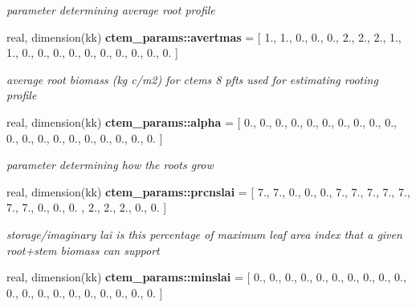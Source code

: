 \begin{DoxyCompactItemize}
\begin{DoxyCompactList}\small\item\em parameter determining average root profile \end{DoxyCompactList}\item 
\hypertarget{namespacectem__params_ad1f59f53c14c2a0c09bfad6b11139bca}{}real, dimension(kk) {\bfseries ctem\+\_\+params\+::avertmas} = \mbox{[} 1., 1., 0., 0., 0., 2., 2., 2., 1., 1., 0., 0., 0., 0., 0., 0., 0., 0., 0., 0. \mbox{]}\label{namespacectem__params_ad1f59f53c14c2a0c09bfad6b11139bca}

\begin{DoxyCompactList}\small\item\em average root biomass (kg c/m2) for ctem\textquotesingle{}s 8 pfts used for estimating rooting profile \end{DoxyCompactList}\item 
\hypertarget{namespacectem__params_aafa01f9ec060f116fdd559e2f9c8b32e}{}real, dimension(kk) {\bfseries ctem\+\_\+params\+::alpha} = \mbox{[} 0., 0., 0., 0., 0., 0., 0., 0., 0., 0., 0., 0., 0., 0., 0., 0., 0., 0., 0., 0. \mbox{]}\label{namespacectem__params_aafa01f9ec060f116fdd559e2f9c8b32e}

\begin{DoxyCompactList}\small\item\em parameter determining how the roots grow \end{DoxyCompactList}\item 
\hypertarget{namespacectem__params_a2bc170a6ee30f73dba8ce44297493550}{}real, dimension(kk) {\bfseries ctem\+\_\+params\+::prcnslai} = \mbox{[} 7., 7., 0., 0., 0., 7., 7., 7., 7., 7., 7., 7., 0., 0., 0. , 2., 2., 2., 0., 0. \mbox{]}\label{namespacectem__params_a2bc170a6ee30f73dba8ce44297493550}

\begin{DoxyCompactList}\small\item\em storage/imaginary lai is this percentage of maximum leaf area index that a given root+stem biomass can support \end{DoxyCompactList}\item 
\hypertarget{namespacectem__params_af7fddd21a0baea756dfde3683a67ec83}{}real, dimension(kk) {\bfseries ctem\+\_\+params\+::minslai} = \mbox{[} 0., 0., 0., 0., 0., 0., 0., 0., 0., 0., 0., 0., 0., 0., 0., 0., 0., 0., 0., 0. \mbox{]}\label{namespacectem__params_af7fddd21a0baea756dfde3683a67ec83}


\end{DoxyCompactItemize}
